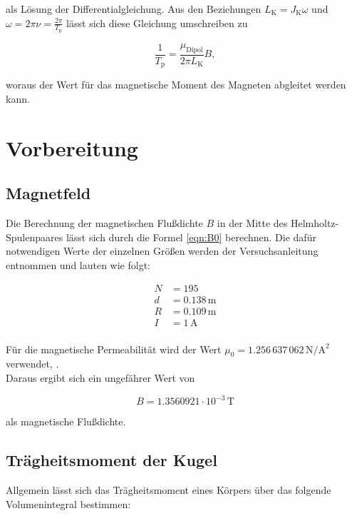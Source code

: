 \noindent als Lösung der Differentialgleichung. Aus den Beziehungen $L_\text{K} = J_\text{K}\omega$ und $\omega = 2\pi\nu
= \frac{2\pi}{T_\text{p}}$ lässt sich diese Gleichung umschreiben zu

\begin{equation}
\label{eqn:Praezession}
    \frac{1}{T_\text{p}} = \frac{\mu_\text{Dipol}}{2\pi{}L_\text{K}}B, 
\end{equation}

\noindent woraus der Wert für das magnetische Moment des Magneten abgleitet werden kann.

\section{Vorbereitung}

\subsection{Magnetfeld}
Die Berechnung der magnetischen Flußdichte $B$ in der Mitte des Helmholtz-Spulenpaares lässt sich durch die Formel 
\eqref{eqn:B0} berechnen. Die dafür notwendigen Werte der einzelnen Größen werden der Versuchsanleitung entnommen und
lauten wie folgt:

\begin{align*}
    N &= 195 \\
    d &= 0.138\,\unit{\meter} \\
    R &= 0.109\,\unit{\meter} \\
    I &= 1\,\unit{\ampere} \\
\end{align*}

\noindent Für die magnetische Permeabilität wird der Wert $\mu_0 = 1.256\,637\,062\,\unit{\newton\per\ampere\squared}$ 
verwendet, \cite{Magnetische_Feldkonstante}.\\

\noindent Daraus ergibt sich ein ungefährer Wert von 

\begin{equation*}
    B = 1.3560921 \cdot 10^{-3}\,\unit{\tesla}
\end{equation*}

\noindent als magnetische Flußdichte.

\subsection{Trägheitsmoment der Kugel}

Allgemein lässt sich das Trägheitsmoment eines Körpers über das folgende Volumenintegral bestimmen:

